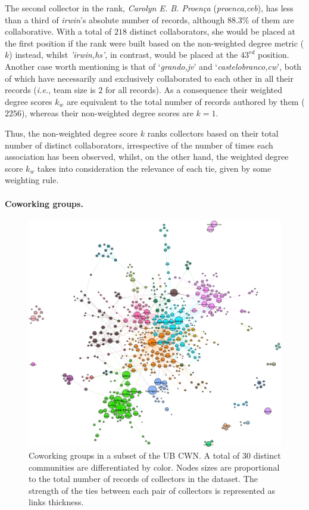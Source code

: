 %
The second collector in the rank, \textit{Carolyn E. B. Proença} (\textit{proenca,ceb}), has less than a third of \textit{irwin}'s absolute number of records, although $88.3\%$ of them are collaborative. 
With a total of $218$ distinct collaborators, she would be placed at the first position if the rank were built based on the non-weighted degree metric ($k$) instead, whilst \textit{'irwin,hs'}, in contrast, would be placed at the $43^{rd}$ position.
%
Another case worth mentioning is that of `\textit{grando,jv}' and `\textit{castelobranco,cw}', both of which have necessarily and exclusively collaborated to each other in all their records (\textit{i.e.}, team size is $2$ for all records).
As a consequence their weighted degree scores $k_w$ are equivalent to the total number of records authored by them ($2256$), whereas their non-weighted degree scores are $k=1$.

Thus, the non-weighted degree score $k$ ranks collectors based on their total number of distinct collaborators, irrespective of the  number of times each association has been observed, whilst, on the other hand, the weighted degree score $k_w$ takes into consideration the relevance of each tie, given by some weighting rule.




\paragraph*{Coworking groups.}

\begin{figure}[h!]
  	\centering
    \includegraphics[width=\linewidth]{figures/casestudy_ub/cwn_communities.pdf}
    \caption{ Coworking groups in a subset of the UB CWN. A total of $30$ distinct communities are differentiated by color. Nodes sizes are proportional to the total number of records of collectors in the dataset. The strength of the ties between each pair of collectors is represented as links thickness.}
    \label{fig:ub_cwn_communities}
\end{figure}

